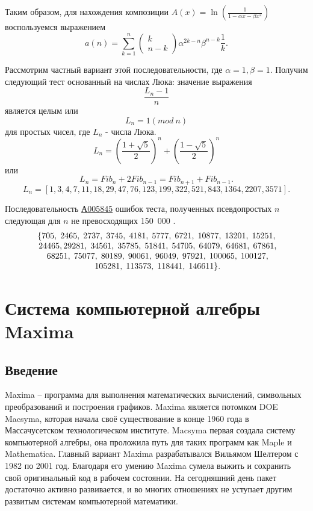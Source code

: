 \documentclass[
russian,
cp1251,
14pt,
simple
]{eskdtext}
\theoremstyle{definition}
\begin{document}
Таким образом, для нахождения композиции $A(x)=\ln (\frac{1}{1-\alpha x-\beta x^{2} } )$ воспользуемся выражением
$$
a(n)=\sum\limits _{k=1}^{n}\left(\begin{array}{c} {k} \\ {n-k} \end{array}\right)\alpha ^{2k-n} \beta ^{n-k} \frac{1}{k} .  
$$

Рассмотрим частный вариант этой последовательности, где $\alpha =1,\beta =1$.  Получим следующий тест основанный на числах Люка: значение выражения \[\frac{L_{n} -1}{n}\] является целым или
\[L_{n} =1(mod\ n)\]
для простых чисел, где $L_{n} $ - числа Люка.
\[L_{n} =\left(\frac{1+\sqrt{5} }{2} \right)^{n} +\left(\frac{1-\sqrt{5} }{2} \right)^{n} \] 
или
\[L_{n} =Fib_{n} +2Fib_{n-1} =Fib_{n+1} +Fib_{n-1} .\] 
\[L_{n} =[1,3,4,7,11,18,29,47,76,123,199,322,521,843,1364,2207,3571].\] 

Последовательность \href{http://oeis.org/А005845}{А005845} ошибок теста, полученных псевдопростых $n$ следующая  для $n$ не превосходящих 150~000 \cite{oeis}.
\[ 
\begin{array}{c} {{\rm \{ 705,\; 2465,\; 2737,\; 3745,\; 4181,\; 5777,\; 6721,\; 10877,\; 13201,\; 15251,}} \\ {{\rm \; 24465,29281,\; 34561,\; 35785,\; 51841,\; 54705,\; 64079,\; 64681,\; 67861,}} \\ {{\rm \; 68251,\; 75077,\; 80189,\; 90061,\; 96049,\; 97921,\; 100065,\; 100127,}} \\ {{\rm \; 105281,\; 113573,\; 118441,\; 146611\} .}} \end{array} 
\]

\newpage
\section{Система компьютерной алгебры Maxima}
\subsection{Введение}
Maxima -- программа для выполнения математических вычислений, символьных преобразований и построения графиков.
Maxima является потомком DOE Macsyma, которая начала своё существование в конце 1960 года в Массачусетском технологическом институте. Macsyma первая создала систему компьютерной алгебры, она проложила путь для таких программ как Maple и Mathematica. Главный вариант Maxima разрабатывался Вильямом Шелтером с 1982 по 2001 год. Благодаря его умению Maxima сумела выжить и сохранить свой оригинальный код в рабочем состоянии. На сегодняшний день пакет достаточно активно развивается, и во многих отношениях не уступает другим развитым системам компьютерной математики.
\end{document}
